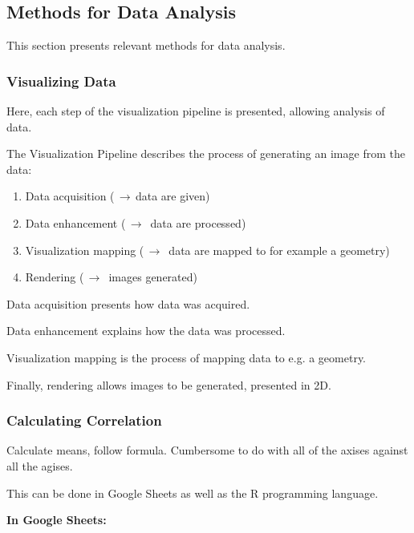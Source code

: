 \subsection{Methods for Data Analysis}

This section presents relevant methods for data analysis.

\subsubsection{Visualizing Data}

Here, each step of the visualization pipeline is presented, allowing analysis of data.

The Visualization Pipeline describes the process of generating an image from the data: \citep{timo-ropinski-liu}

\begin{enumerate}
\item Data acquisition ($\,\to\,$data are given)
\item Data enhancement ($\,\to\,$ data are processed)
\item Visualization mapping ($\,\to\,$ data are mapped to for example a geometry)
\item Rendering ($\,\to\,$ images generated)
\end{enumerate}


Data acquisition presents how data was acquired.

Data enhancement explains how the data was processed.

Visualization mapping is the process of mapping data to e.g. a geometry.

Finally, rendering allows images to be generated, presented in 2D.

\subsubsection{Calculating Correlation}

Calculate means, follow formula. Cumbersome to do with all of the axises against all the agises.

This can be done in Google Sheets as well as the R programming language.

\textbf{In Google Sheets: }

